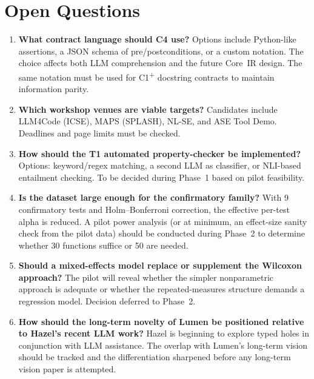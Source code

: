 \documentclass[11pt]{article}
\begin{document}
\section{Open Questions}
\label{sec:open}

\begin{enumerate}
  \item \textbf{What contract language should C4 use?}
        Options include Python-like assertions, a JSON schema of
        pre/postconditions, or a custom notation.  The choice affects
        both LLM comprehension and the future Core~IR design.  The
        same notation must be used for C1\textsuperscript{+} docstring
        contracts to maintain information parity.

  \item \textbf{Which workshop venues are viable targets?}
        Candidates include LLM4Code (ICSE), MAPS (SPLASH), NL-SE,
        and ASE Tool Demo.  Deadlines and page limits must be checked.

  \item \textbf{How should the T1 automated property-checker be
        implemented?}
        Options: keyword/regex matching, a second LLM as classifier,
        or NLI-based entailment checking.  To be decided during
        Phase~1 based on pilot feasibility.

  \item \textbf{Is the dataset large enough for the confirmatory
        family?}
        With 9 confirmatory tests and Holm--Bonferroni correction, the
        effective per-test alpha is reduced.  A pilot power analysis
        (or at minimum, an effect-size sanity check from the pilot
        data) should be conducted during Phase~2 to determine whether
        30 functions suffice or 50 are needed.

  \item \textbf{Should a mixed-effects model replace or supplement the
        Wilcoxon approach?}
        The pilot will reveal whether the simpler nonparametric
        approach is adequate or whether the repeated-measures structure
        demands a regression model.  Decision deferred to Phase~2.

  \item \textbf{How should the long-term novelty of Lumen be
        positioned relative to Hazel's recent LLM work?}
        Hazel is beginning to explore typed holes in conjunction with
        LLM assistance.  The overlap with Lumen's long-term vision
        should be tracked and the differentiation sharpened before any
        long-term vision paper is attempted.
\end{enumerate}
\end{document}

